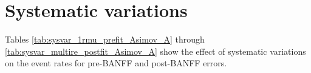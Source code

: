 \section{Systematic variations}
\label{app:sysvar}

Tables \cref{tab:sysvar_1rmu_prefit_Asimov_A} through \cref{tab:sysvar_multire_postfit_Asimov_A} show the effect of systematic variations on the event rates for pre-BANFF and post-BANFF errors.













\clearpage